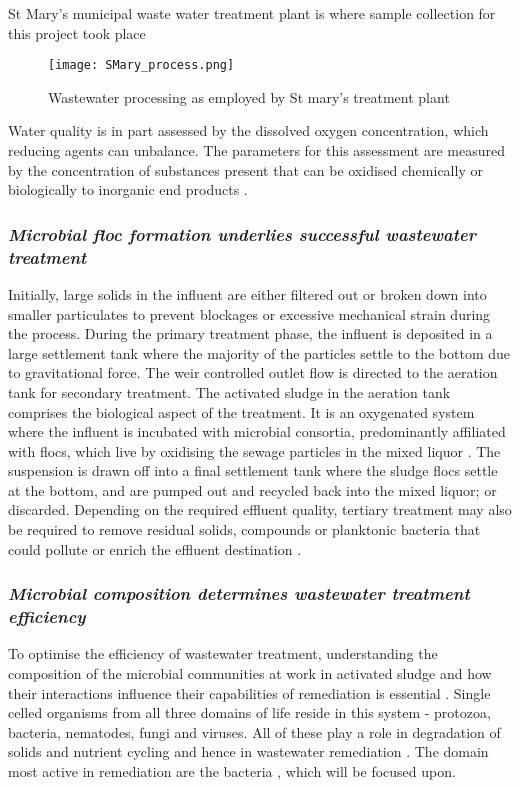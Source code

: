 \documentclass[11pt]{article}
\begin{document}
St Mary's municipal waste water treatment plant is where sample collection for this project took place
\begin{figure}
\texttt{[image: SMary\_process.png]}
\caption{Wastewater processing as employed by St mary's treatment plant}
\end{figure}
Water quality is in part assessed by the dissolved oxygen concentration, which reducing agents can unbalance. The parameters for this assessment are measured by the concentration of substances present that can be oxidised chemically or biologically to inorganic end products \cite{pisarevsky2005chemical}.

\subsubsection{\emph{Microbial floc formation underlies successful wastewater treatment}}
Initially, large solids in the influent are either filtered out or broken down into smaller particulates to prevent blockages or excessive mechanical strain during the process. During the primary treatment phase, the influent is deposited in a large settlement tank where the majority of the particles settle to the bottom due to gravitational force. The weir controlled outlet flow is directed to the aeration tank for secondary treatment. The activated sludge in the aeration tank comprises the biological aspect of the treatment. It is an oxygenated system where the influent is incubated with microbial consortia, predominantly affiliated with flocs, which live by oxidising the sewage particles in the mixed liquor \cite{mayhew1997low}. The suspension is drawn off into a final settlement tank where the sludge flocs settle at the bottom, and are pumped out and recycled back into the mixed liquor; or discarded. Depending on the required effluent quality, tertiary treatment may also be required to remove residual solids, compounds or planktonic bacteria that could pollute or enrich the effluent destination \cite{Price_95}.

\subsubsection{\emph{Microbial composition determines wastewater treatment efficiency}}
To optimise the efficiency of wastewater treatment, understanding the composition of the microbial communities at work in activated sludge and how their interactions influence their capabilities of remediation is essential \cite{daims2006}.
Single celled organisms from all three domains of life reside in this system - protozoa, bacteria, nematodes, fungi and viruses. All of these play a role in degradation of solids and nutrient cycling and hence in wastewater remediation \cite{muchie2010bioremediation}. The domain most active in remediation are the bacteria \cite{spellman2008handbook}, which will be focused upon.
\end{document}
